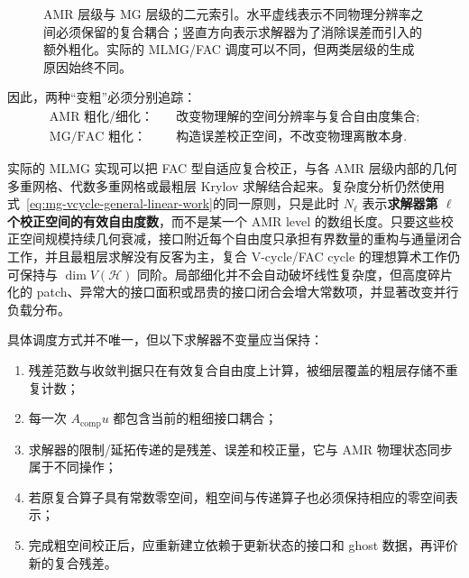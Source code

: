 \begin{figure}[htbp]
\centering
{}
\caption{AMR 层级与 MG 层级的二元索引。水平虚线表示不同物理分辨率之间必须保留的复合耦合；竖直方向表示求解器为了消除误差而引入的额外粗化。实际的 MLMG/FAC 调度可以不同，但两类层级的生成原因始终不同。}
\label{fig:amr_mg_hierarchy}
\end{figure}

因此，两种“变粗”必须分别追踪：
\begin{equation}
\boxed{
\begin{aligned}
\text{AMR 粗化/细化：}&\quad
\text{改变物理解的空间分辨率与复合自由度集合};\\
\text{MG/FAC 粗化：}&\quad
\text{构造误差校正空间，不改变物理离散本身}.
\end{aligned}}
\label{eq:amr-mg-two-coarsenings}
\end{equation}

实际的 MLMG 实现可以把 FAC 型自适应复合校正，与各 AMR 层级内部的几何多重网格、代数多重网格或最粗层 Krylov 求解结合起来。复杂度分析仍然使用式~\eqref{eq:mg-vcycle-general-linear-work}的同一原则，只是此时 $N_\ell$ 表示\textbf{求解器第 $\ell$ 个校正空间的有效自由度数}，而不是某一个 AMR level 的数组长度。只要这些校正空间规模持续几何衰减，接口附近每个自由度只承担有界数量的重构与通量闭合工作，并且最粗层求解没有反客为主，复合 V-cycle/FAC cycle 的理想算术工作仍可保持与 $\dim V(\mathcal H)$ 同阶。局部细化并不会自动破坏线性复杂度，但高度碎片化的 patch、异常大的接口面积或昂贵的接口闭合会增大常数项，并显著改变并行负载分布。

具体调度方式并不唯一，但以下求解器不变量应当保持：
\begin{enumerate}
\item 残差范数与收敛判据只在有效复合自由度上计算，被细层覆盖的粗层存储不重复计数；
\item 每一次 $A_{\mathrm{comp}}u$ 都包含当前的粗细接口耦合；
\item 求解器的限制/延拓传递的是残差、误差和校正量，它与 AMR 物理状态同步属于不同操作；
\item 若原复合算子具有常数零空间，粗空间与传递算子也必须保持相应的零空间表示；
\item 完成粗空间校正后，应重新建立依赖于更新状态的接口和 ghost 数据，再评价新的复合残差。
\end{enumerate}

